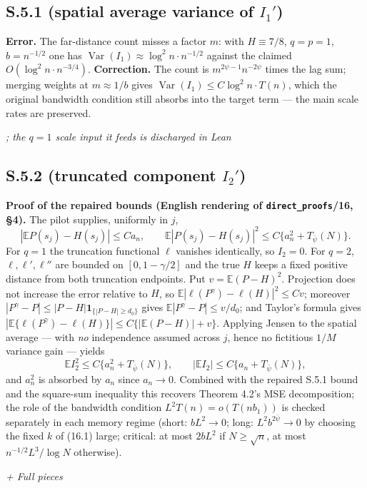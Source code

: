 \documentclass[11pt]{article}
\theoremstyle{definition}
\theoremstyle{remark}
\newcommand{\statustag}[1]{%
  \par\nobreak\begingroup\footnotesize\itshape\raggedleft #1\par\endgroup}
\newcommand{\Wwritten}{[written]}
\begin{document}
\smallskip{}

\subsection{S.5.1 (spatial average variance of $I_1'$)}
\textbf{Error.} The far-distance count misses a factor $m$: with
$H\equiv7/8$, $q=p=1$, $b=n^{-1/2}$ one has
$\operatorname{Var}(I_1)\approx\log^2n\cdot n^{-1/2}$ against the claimed
$O(\log^2n\cdot n^{-3/4})$.
\textbf{Correction.} The count is $m^{2\psi-1}n^{-2\psi}$ times the lag sum;
merging weights at $m\approx1/b$ gives
$\operatorname{Var}(I_1)\le C\log^2n\cdot T(n)$, which the original bandwidth
condition still absorbs into the target term --- the main scale rates are
preserved. \statustag{\Wwritten; the $q=1$ scale input it feeds is
discharged in Lean}

\subsection{S.5.2 (truncated component $I_2'$)}
\textbf{Proof of the repaired bounds (English rendering of
\texttt{direct\_proofs}/16, \S4).} The pilot supplies, uniformly in $j$,
\[
|\mathbb EP(s_j)-H(s_j)|\le Ca_n,
\qquad
\mathbb E|P(s_j)-H(s_j)|^{2}\le C\{a_n^{2}+T_{\bar\psi}(N)\}.
\]
For $q=1$ the truncation functional $\ell$ vanishes identically, so
$I_2=0$. For $q=2$, $\ell,\ell',\ell''$ are bounded on
$[0,1-\gamma/2]$ and the true $H$ keeps a fixed positive distance from both
truncation endpoints. Put $v=\mathbb E(P-H)^{2}$. Projection does not
increase the error relative to $H$, so
$\mathbb E|\ell(P^{\gamma})-\ell(H)|^{2}\le Cv$; moreover
$|P^{\gamma}-P|\le|P-H|\mathbf 1_{\{|P-H|\ge d_0\}}$ gives
$\mathbb E|P^{\gamma}-P|\le v/d_0$; and Taylor's formula gives
$|\mathbb E\{\ell(P^{\gamma})-\ell(H)\}|\le C\{|\mathbb E(P-H)|+v\}$.
Applying Jensen to the spatial average --- with \emph{no} independence
assumed across $j$, hence no fictitious $1/M$ variance gain --- yields
\[
\mathbb EI_2^{2}\le C\{a_n^{2}+T_{\bar\psi}(N)\},
\qquad
|\mathbb EI_2|\le C\{a_n+T_{\bar\psi}(N)\},
\]
and $a_n^{2}$ is absorbed by $a_n$ since $a_n\to0$. Combined with the
repaired S.5.1 bound and the square-sum inequality this recovers Theorem
4.2's MSE decomposition; the role of the bandwidth condition
$L^{2}T(n)=o(T(nb_1))$ is checked separately in each memory regime
(short: $bL^{2}\to0$; long: $L^{2}b^{2\bar\psi}\to0$ by choosing the fixed
$k$ of (16.1) large; critical: at most $2bL^{2}$ if $N\ge\sqrt n$, at most
$n^{-1/2}L^{3}/\log N$ otherwise).
\statustag{\Wwritten + Full pieces}
\end{document}
